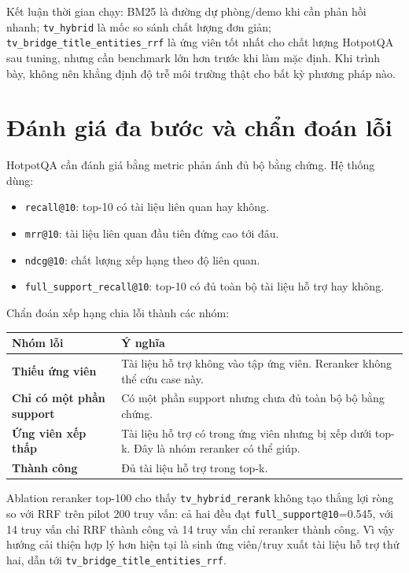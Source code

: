\documentclass[11pt,a4paper]{article}
\newcommand{\method}[1]{\texttt{#1}}
\newcommand{\metric}[1]{\texttt{#1}}
\begin{document}
Kết luận thời gian chạy: BM25 là đường dự phòng/demo khi cần phản hồi nhanh; \method{tv\_hybrid} là
mốc so sánh chất lượng đơn giản; \method{tv\_bridge\_title\_entities\_rrf} là ứng viên tốt nhất
cho chất lượng HotpotQA sau tuning, nhưng cần benchmark lớn hơn trước khi làm mặc định. Khi trình bày,
không nên khẳng định độ trễ môi trường thật cho bất kỳ phương pháp nào.

\section{Đánh giá đa bước và chẩn đoán lỗi}

HotpotQA cần đánh giá bằng metric phản ánh đủ bộ bằng chứng. Hệ thống dùng:

\begin{itemize}
  \item \metric{recall@10}: top-10 có tài liệu liên quan hay không.
  \item \metric{mrr@10}: tài liệu liên quan đầu tiên đứng cao tới đâu.
  \item \metric{ndcg@10}: chất lượng xếp hạng theo độ liên quan.
  \item \metric{full\_support\_recall@10}: top-10 có đủ toàn bộ tài liệu hỗ trợ hay không.
\end{itemize}

Chẩn đoán xếp hạng chia lỗi thành các nhóm:

\begin{tabularx}{\textwidth}{>{\bfseries}p{} Y}
\toprule
Nhóm lỗi & Ý nghĩa \\
\midrule
Thiếu ứng viên & Tài liệu hỗ trợ không vào tập ứng viên. Reranker không thể cứu case này. \\
Chỉ có một phần support & Có một phần support nhưng chưa đủ toàn bộ bộ bằng chứng. \\
Ứng viên xếp thấp & Tài liệu hỗ trợ có trong ứng viên nhưng bị xếp dưới top-k. Đây là nhóm reranker có thể giúp. \\
Thành công & Đủ tài liệu hỗ trợ trong top-k. \\
\bottomrule
\end{tabularx}

Ablation reranker top-100 cho thấy \method{tv\_hybrid\_rerank} không tạo thắng lợi ròng so với RRF
trên pilot 200 truy vấn: cả hai đều đạt \metric{full\_support@10}=0.545, với 14 truy vấn chỉ RRF
thành công và 14 truy vấn chỉ reranker thành công. Vì vậy hướng cải thiện hợp lý hơn hiện tại là
sinh ứng viên/truy xuất tài liệu hỗ trợ thứ hai, dẫn tới \method{tv\_bridge\_title\_entities\_rrf}.
\end{document}
